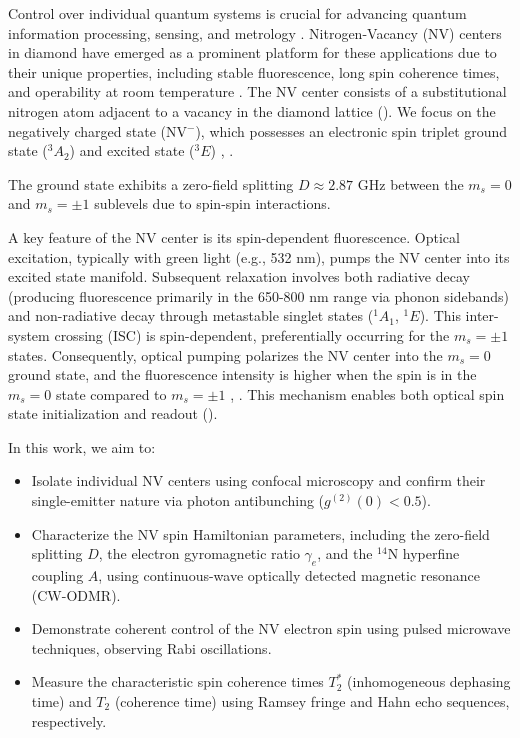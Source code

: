 \documentclass[aps,prb,twocolumn,superscriptaddress,floatfix,longbibliography,citeautoscript]{revtex4-2}
\begin{document}
Control over individual quantum systems is crucial for advancing quantum information processing, sensing, and metrology . %
Nitrogen-Vacancy (NV) centers in diamond have emerged as a prominent platform for these applications due to their unique properties, including stable fluorescence, long spin coherence times, and operability at room temperature . %
The NV center consists of a substitutional nitrogen atom adjacent to a 
vacancy in the diamond lattice (). 
We focus on the negatively charged state (NV$^-$), 
which possesses an electronic spin triplet ground state ($^3 A_2$) 
and excited state ($^3 E$) , 
. %

The ground state exhibits a zero-field splitting $D \approx 2.87$ GHz between the $m_s=0$ and $m_s=\pm 1$ sublevels due to spin-spin interactions. 

A key feature of the NV center is its spin-dependent 
fluorescence. Optical excitation, typically with green light (e.g., 532 nm), 
pumps the NV center into its excited state manifold. 
Subsequent relaxation involves both radiative decay (producing fluorescence primarily in the 650-800 nm range via phonon sidebands) 
and non-radiative decay through metastable singlet states ($^1 A_1$, $^1 E$). 
This inter-system crossing (ISC) is spin-dependent, preferentially occurring for the $m_s=\pm 1$ states. 
Consequently, optical pumping polarizes the NV center into the $m_s=0$ ground state, 
and the fluorescence intensity is higher when the spin is in the $m_s=0$ state compared to $m_s=\pm 1$ 
, . This mechanism enables both optical spin state initialization and readout 
(). 

In this work, we aim to:
\begin{itemize}
    \item Isolate individual NV centers using confocal microscopy and confirm their single-emitter nature via photon antibunching ($g^{(2)}(0) < 0.5$).
    \item Characterize the NV spin Hamiltonian parameters, including the zero-field splitting $D$, the electron gyromagnetic ratio $\gamma_e$, and the $^{14}$N hyperfine coupling $A$, using continuous-wave optically detected magnetic resonance (CW-ODMR).
    \item Demonstrate coherent control of the NV electron spin using pulsed microwave techniques, observing Rabi oscillations.
    \item Measure the characteristic spin coherence times $T_2^*$ (inhomogeneous dephasing time) and $T_2$ (coherence time) using Ramsey fringe and Hahn echo sequences, respectively.
\end{itemize}
\end{document}
